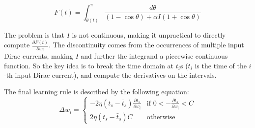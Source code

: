 \begin{equation}
\label{F_t}
	F(t) = \int_{\theta(t)}^\pi \frac{d \theta}{(1-\cos \theta) + \alpha I (1 + \cos \theta)}
\end{equation}

The problem is that $I$ is not continuous, making it unpractical to directly compute $\frac{\partial F(t)}{\partial w_i}$. 
The discontinuity comes from the occurrences of multiple input Dirac currents,
making $I$ and further the integrand a piecewise continuous function.
So the key idea is to break the time domain at $t_i$s ($t_i$ is the time of the $i$-th input Dirac current), 
and compute the derivatives on the intervals.

The final learning rule is described by the following equation:
\begin{equation}
\Delta w_i =
\left\{ \begin{array}{lr}
 -2\eta (t_s - \bar{t}_s) \frac{\partial t_s}{\partial w_i} & \text{if } 0 < - \frac{\partial t_s}{\partial w_i}  < C\\
2\eta (t_s - \bar{t}_s) C & \text{otherwise}
  \end{array} \right.
\end{equation}




